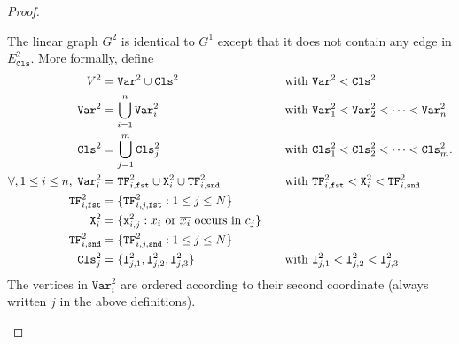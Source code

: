 \begin{proof}
  \begin{mdframed}
    The linear graph $G^{2}$ is identical to $G^{1}$ except that it does not
    contain any edge in $E^{2}_{\texttt{Cls}}$.
    More formally,
    define
    \begin{alignat*} {2}
      V^{2} &= \texttt{Var}^{2} \cup \texttt{Cls}^{2}
      &\quad&\text{with $\texttt{Var}^{2} < \texttt{Cls}^{2}$}
      \\
      \texttt{Var}^{2} &= \bigcup_{i=1}^{n} \texttt{Var}^{2}_{i}
      &&\text{with $\texttt{Var}^{2}_1 < \texttt{Var}^{2}_2 < \dots < \texttt{Var}^{2}_n$}
      \\
      \texttt{Cls}^{2} &= \bigcup_{j=1}^{m} \texttt{Cls}^{2}_{j}
      &&\text{with $\texttt{Cls}^{2}_1 < \texttt{Cls}^{2}_2 < \dots < \texttt{Cls}^{2}_m$.}
      \\
      \forall, 1 \leq i \leq n,\;
      \texttt{Var}^{2}_{i} &= \texttt{TF}^{2}_{i,\texttt{fst}} \cup \texttt{X}^{2}_{i} \cup \texttt{TF}^{2}_{i,\texttt{snd}}
      &&\text{with $\texttt{TF}^{2}_{i,\texttt{fst}} < \texttt{X}^{2}_{i} < \texttt{TF}^{2}_{i,\texttt{snd}}$}
      \\
      \texttt{TF}^{2}_{i,\texttt{fst}}
      &=
      \{\texttt{TF}^{2}_{i,j,\texttt{fst}} : 1 \leq j \leq N\}
      &&\\
      \texttt{X}^{2}_{i}
      &=
      \{\texttt{x}^{2}_{i,j} : \text{$x_{i}$ or $\overline{x_{i}}$ occurs in $c_{j}$}\}
      &&\\
      \texttt{TF}^{2}_{i,\texttt{snd}}
      &=
      \{\texttt{TF}^{2}_{i,j,\texttt{snd}} : 1 \leq j \leq N\}
      &&
      \\
      \texttt{Cls}^{2}_{j}
      &=
      \{
      \texttt{l}^{2}_{j,1},
      \texttt{l}^{2}_{j,2},
      \texttt{l}^{2}_{j,3}
      \}
      &&\text{with $\texttt{l}^{2}_{j,1} < \texttt{l}^{2}_{j,2} < \texttt{l}^{2}_{j,3}$}
      \\
    \end{alignat*}
    The vertices in $\texttt{Var}^{2}_{i}$ are ordered according to their second coordinate
    (always written $j$ in the above definitions).


\end{mdframed}
\end{proof}
